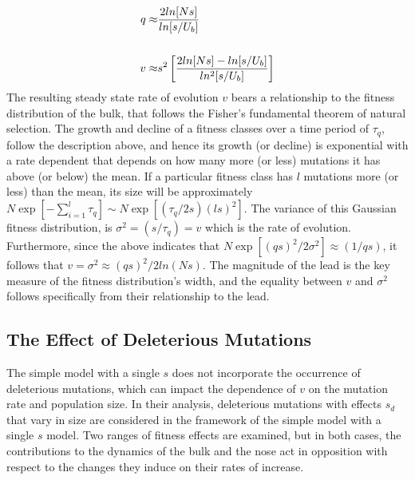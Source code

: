 \documentclass[12pt]{article}
\begin{document}
\begin{equation}
\begin{aligned}
q \approx & {2ln[Ns] \over ln[s/U_b]} \\   
\\
v \approx & s^2 \left[{2ln[Ns] - ln[s/U_b] \over ln^2[s/U_b]}\right]
\end{aligned}
\end{equation} 
The resulting steady state rate of evolution $v$ bears a relationship to the fitness distribution of the bulk, that follows the Fisher's fundamental theorem of natural selection.  The growth and decline of a fitness classes over a time period of $\tau_q$, follow the description above, and hence its growth (or decline) is exponential with a rate dependent that depends on how many more (or less) mutations it has above (or below) the mean.  If a particular fitness class has $l$ mutations  more (or less) than the mean, its size will be approximately $N \exp[-\sum_{i=1}^{l} \tau_q] \sim N \exp[(\tau_q/2s)(ls)^2]$.  The variance of this Gaussian fitness distribution, is $\sigma^2 = (s/\tau_q)=v$ which is the rate of evolution.  Furthermore, since the above indicates that $N \exp[(qs)^2/2\sigma^2]\approx (1/qs)$, it follows that $v=\sigma^2 \approx (qs)^2/2ln(Ns)$.  The magnitude of the lead is the key measure of the fitness distribution's width, and the equality between $v$ and $\sigma^2$ follows specifically from their relationship to the lead.

\subsection*{The Effect of Deleterious Mutations}
The simple model with a single $s$ does not incorporate the occurrence of deleterious mutations, which can impact the dependence of $v$ on the mutation rate and population size.  In their analysis, deleterious mutations with effects $s_d$ that vary in size are considered in the framework of the simple model with a single $s$ model.  Two ranges of fitness effects are examined, but in both cases, the contributions to the dynamics of the bulk and the nose act in opposition with respect to the changes they induce on their rates of increase.   
\end{document}
